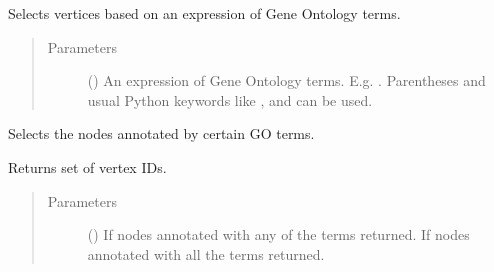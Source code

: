 \documentclass[letterpaper,10pt,english]{sphinxmanual}
\begin{document}
\begin{fulllineitems}
\begin{fulllineitems}
\label{\detokenize{main:pypath.main.PyPath.select_by_go_expr}}
Selects vertices based on an expression of Gene Ontology terms.
\begin{quote}\begin{description}
\item[{Parameters}] \leavevmode
{} () \textendash{} An expression of Gene Ontology terms. E.g.
. Parentheses
and usual Python keywords like ,  and 
can be used.

\end{description}\end{quote}

\end{fulllineitems}


\begin{fulllineitems}
\label{\detokenize{main:pypath.main.PyPath.select_by_go_old}}
Selects the nodes annotated by certain GO terms.

Returns set of vertex IDs.
\begin{quote}\begin{description}
\item[{Parameters}] \leavevmode
{} () \textendash{} If  nodes annotated with any of the terms returned.
If  nodes annotated with all the terms returned.

\end{description}\end{quote}

\end{fulllineitems}



\end{fulllineitems}
\end{document}
